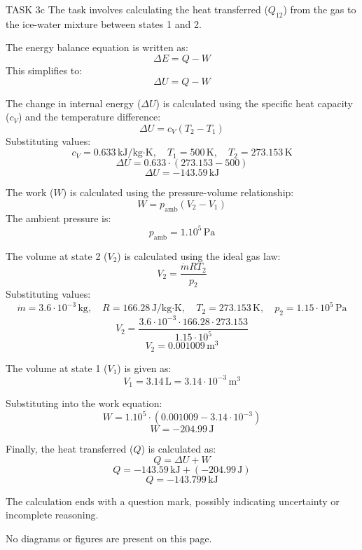 TASK 3c  
The task involves calculating the heat transferred (\( Q_{12} \)) from the gas to the ice-water mixture between states 1 and 2.

The energy balance equation is written as:  
\[
\Delta E = Q - W
\]  
This simplifies to:  
\[
\Delta U = Q - W
\]  

The change in internal energy (\( \Delta U \)) is calculated using the specific heat capacity (\( c_V \)) and the temperature difference:  
\[
\Delta U = c_V (T_2 - T_1)
\]  
Substituting values:  
\[
c_V = 0.633 \, \text{kJ/kg·K}, \quad T_1 = 500 \, \text{K}, \quad T_2 = 273.153 \, \text{K}
\]  
\[
\Delta U = 0.633 \cdot (273.153 - 500)
\]  
\[
\Delta U = -143.59 \, \text{kJ}
\]  

The work (\( W \)) is calculated using the pressure-volume relationship:  
\[
W = p_{\text{amb}} (V_2 - V_1)
\]  
The ambient pressure is:  
\[
p_{\text{amb}} = 1.10^5 \, \text{Pa}
\]  

The volume at state 2 (\( V_2 \)) is calculated using the ideal gas law:  
\[
V_2 = \frac{\dot{m} R T_2}{p_2}
\]  
Substituting values:  
\[
\dot{m} = 3.6 \cdot 10^{-3} \, \text{kg}, \quad R = 166.28 \, \text{J/kg·K}, \quad T_2 = 273.153 \, \text{K}, \quad p_2 = 1.15 \cdot 10^5 \, \text{Pa}
\]  
\[
V_2 = \frac{3.6 \cdot 10^{-3} \cdot 166.28 \cdot 273.153}{1.15 \cdot 10^5}
\]  
\[
V_2 = 0.001009 \, \text{m}^3
\]  

The volume at state 1 (\( V_1 \)) is given as:  
\[
V_1 = 3.14 \, \text{L} = 3.14 \cdot 10^{-3} \, \text{m}^3
\]  

Substituting into the work equation:  
\[
W = 1.10^5 \cdot (0.001009 - 3.14 \cdot 10^{-3})
\]  
\[
W = -204.99 \, \text{J}
\]  

Finally, the heat transferred (\( Q \)) is calculated as:  
\[
Q = \Delta U + W
\]  
\[
Q = -143.59 \, \text{kJ} + (-204.99 \, \text{J})
\]  
\[
Q = -143.799 \, \text{kJ}
\]  

The calculation ends with a question mark, possibly indicating uncertainty or incomplete reasoning.  

No diagrams or figures are present on this page.